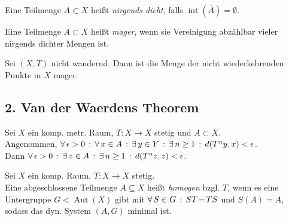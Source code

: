 \documentclass{cheat-sheet}
\DeclareMathOperator{\Aut}{Aut} %
\newcommand{\clos}[1]{\overline{#1}} %
\DeclareMathOperator{\inte}{int} %
\begin{document}

\begin{defn}
  Eine Teilmenge $A \!\subset\! X$  heißt \emph{nirgends dicht}, falls $\inte(\clos{A}) = \emptyset$.
\end{defn}

\begin{defn}
  Eine Teilmenge $A \!\subset\! X$ heißt \emph{mager}, wenn sie Vereinigung abzählbar vieler nirgends dichter Mengen ist.
\end{defn}

\begin{thm}
  Sei $(X, T)$ nicht wandernd. Dann ist die Menge der nicht wiederkehrenden Punkte in $X$ mager.
\end{thm}



\begin{samepage}
  \section{2. Van der Waerdens Theorem}
\end{samepage}



\begin{lem} %
  Sei $X$ ein komp. metr. Raum, $T \!:\! X \!\to\! X$ stetig und $A \!\subset\! X$. \\
  Angenommen, $\forall \, {\epsilon > 0} \,:\, \forall \, {x \in A} \,:\, \exists \, {y \in Y} \,:\, \exists \, {n \geq 1} \,:\, d(T^n y, x) < \epsilon$. \\
  Dann $\forall \, {\epsilon > 0} \,:\, \exists \, {z \in A} \,:\, \exists \, {n \geq 1} \,:\, d(T^n z, z) < \epsilon$.
\end{lem}

\begin{defn}
  Sei $X$ ein komp. Raum, $T : X \to X$ stetig. \\
  Eine abgeschlossene Teilmenge $A \subseteq X$ heißt \emph{homogen} bzgl. $T$, wenn es eine Untergruppe $G \!<\! \Aut(X)$ gibt mit $\forall \, {S \in G} \,:\, ST \!=\! TS$ und $S(A) \!=\! A$, sodass das dyn. System $(A, G)$ minimal ist.
\end{defn}
\end{document}
